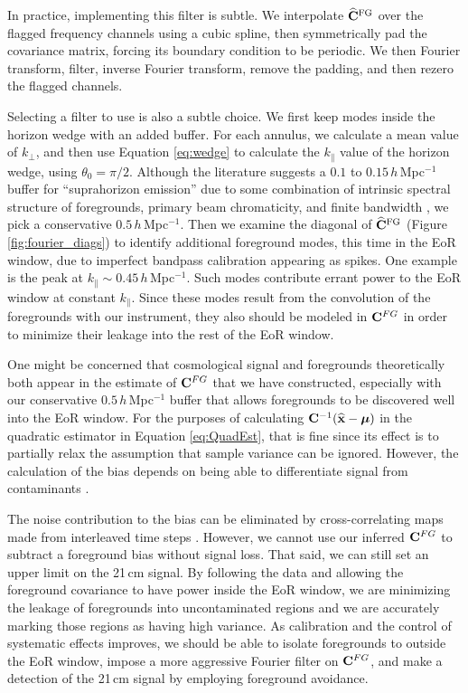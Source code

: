 In practice, implementing this filter is subtle. We interpolate $\widehat{\mathbf{C}}^\text{FG}$ over the flagged frequency channels using a cubic spline, then symmetrically pad the covariance matrix, forcing its boundary condition to be periodic. We then Fourier transform, filter, inverse Fourier transform, remove the padding, and then rezero the flagged channels. 

Selecting a filter to use is also a subtle choice. We first keep modes inside the horizon wedge with an added buffer. For each annulus, we calculate a mean value of $k_\perp$, and then use Equation \eqref{eq:wedge} to calculate the $k_\|$ value of the horizon wedge, using $\theta_0 = \pi/2$. Although the literature suggests a $0.1$ to $0.15$\,$h$\,Mpc$^{-1}$ buffer for ``suprahorizon emission'' due to some combination of intrinsic spectral structure of foregrounds, primary beam chromaticity, and finite bandwidth \cite{pober13,PoberNextGen}, we pick a conservative $0.5$\,$h$\,Mpc$^{-1}$. Then we examine the diagonal of $\widehat{\mathbf{C}}^\text{FG}$ (Figure \ref{fig:fourier_diags}) to identify additional foreground modes, this time in the EoR window, due to imperfect bandpass calibration appearing as spikes. One example is the peak at $k_\| \sim 0.45$\,$h$\,Mpc$^{-1}$. Such modes contribute errant power to the EoR window at constant $k_\|$. Since these modes result from the convolution of the foregrounds with our instrument, they also should be modeled in $\mathbf{C}^{FG}$ in order to minimize their leakage into the rest of the EoR window. 

One might be concerned that cosmological signal and foregrounds theoretically both appear in the estimate of $\mathbf{C}^{FG}$ that we have constructed, especially with our conservative $0.5$\,$h$\,Mpc$^{-1}$ buffer that allows foregrounds to be discovered well into the EoR window. For the purposes of calculating $\mathbf{C}^{-1}(\widehat{\mathbf{x}}-\boldsymbol\mu)$ in the quadratic estimator in Equation \eqref{eq:QuadEst}, that is fine since its effect is to partially relax the assumption that sample variance can be ignored. However, the calculation of the bias depends on being able to differentiate signal from contaminants \cite{Maxpowerspeclossless,LT11,DillonFast}. 

The noise contribution to the bias can be eliminated by cross-correlating maps made from interleaved time steps \cite{X13}. However, we cannot use our inferred $\mathbf{C}^{FG}$ to subtract a foreground bias without signal loss. That said, we can still set an upper limit on the 21\,cm signal. By following the data and allowing the foreground covariance to have power inside the EoR window, we are minimizing the leakage of foregrounds into uncontaminated regions and we are accurately marking those regions as having high variance. As calibration and the control of systematic effects improves, we should be able to isolate foregrounds to outside the EoR window, impose a more aggressive Fourier filter on $\mathbf{C}^{FG}$, and make a detection of the 21\,cm signal by employing foreground avoidance.

